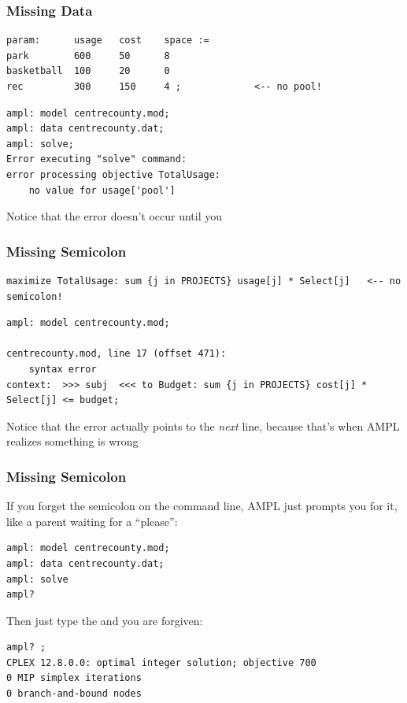 \begin{frame}[fragile]

	\frametitle{Missing Data}
	
\begin{lstlisting}
param:		usage	cost	space :=
park		600		50		8
basketball	100		20		0
rec			300		150		4 ;				<-- no pool!
\end{lstlisting}


\begin{lstlisting}
ampl: model centrecounty.mod;
ampl: data centrecounty.dat;
ampl: solve;
Error executing "solve" command:
error processing objective TotalUsage:
	no value for usage['pool']
\end{lstlisting}

	\bit
	\item Notice that the error doesn't occur until you 
	\eit
	
\end{frame}


\begin{frame}[fragile]

	\frametitle{Missing Semicolon}
	
\begin{lstlisting}
maximize TotalUsage: sum {j in PROJECTS} usage[j] * Select[j]	<-- no semicolon!
\end{lstlisting}


\begin{lstlisting}
ampl: model centrecounty.mod;

centrecounty.mod, line 17 (offset 471):
	syntax error
context:  >>> subj  <<< to Budget: sum {j in PROJECTS} cost[j] * Select[j] <= budget;
\end{lstlisting}

	\bit
	\item Notice that the error actually points to the {\em next} line, because that's when AMPL realizes something is wrong
	\eit
	
\end{frame}

\begin{frame}[fragile]

	\frametitle{Missing Semicolon}

	\bit
	\item If you forget the semicolon on the command line, AMPL just prompts you for it, like a parent waiting for a ``please'':
	\eit
	
\begin{lstlisting}
ampl: model centrecounty.mod;
ampl: data centrecounty.dat;
ampl: solve
ampl? 
\end{lstlisting}

	\bit
	\item Then just type the \myinline{;} and you are forgiven:
	\eit
	
\begin{lstlisting}
ampl? ;
CPLEX 12.8.0.0: optimal integer solution; objective 700
0 MIP simplex iterations
0 branch-and-bound nodes
\end{lstlisting}

\end{frame}



